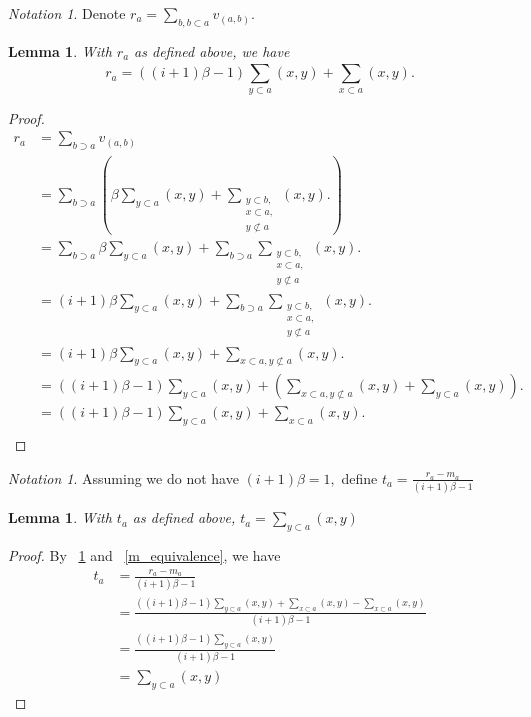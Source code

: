\documentclass[10 pt]{amsart}
\theoremstyle{plain}
\newtheorem{lem}[thm]{Lemma}
\theoremstyle{definition}
\theoremstyle{remark}
\newtheorem{note}[thm]{Notation}
\numberwithin{equation}{section}
\begin{document}
\begin{note}
Denote $r_a = \sum_{b,b\subset a}^{} v_{(a, b)}.$
\end{note}

\begin{lem}
\label{r_equivalence}
With $r_a$ as defined above, we have 
$$r_a = ((i+1)\beta-1)\sum_{y\subset a}^{}(x, y) +\sum_{x\subset a}^{}(x,y).$$
\end{lem}
\begin{proof}
\begin{align*}
  r_a &= \sum_{b\supset a}^{}v_{(a, b)}\\
  &=\sum_{b\supset a}^{} \left(\beta \sum_{y \subset a}^{}(x, y) + \sum_{\substack{{y\subset b,}\\{x \subset a,}\\{y\not\subset a}}}^{}(x, y).\right)\\
  &= \sum_{b\supset a}^{} \beta \sum_{y \subset a}^{}(x, y) + \sum_{b\supset a}^{} \sum_{\substack{{y\subset b,}\\{x \subset a,}\\{y\not\subset a}}}^{}(x, y).\\
  &= (i+1)\beta \sum_{y \subset a}^{}(x, y) + \sum_{b\supset a}^{} \sum_{\substack{{y\subset b,}\\{x \subset a,}\\{y\not\subset a}}}^{}(x, y).\\
  &= (i+1)\beta \sum_{y \subset a}^{}(x, y) + \sum_{x \subset a,y\not\subset a}^{}(x, y).\\
  &= ((i+1)\beta-1) \sum_{y \subset a}^{}(x, y) + \left( \sum_{x \subset a,y\not\subset a}^{}(x, y)+\sum_{y \subset a}^{}(x, y)\right).\\
  &= ((i+1)\beta-1) \sum_{y \subset a}^{}(x, y) + \sum_{x \subset a}^{}(x, y).\\
\end{align*}
\end{proof}
\begin{note}
Assuming we do not have $(i+1)\beta = 1,$ define $t_a = \frac{r_a - m_a}{(i+1)\beta - 1}$
\end{note}

\begin{lem}
\label{t_equivalence}
With $t_a$ as defined above, $t_a= \sum_{y\subset a}^{}(x, y) $
\end{lem}
\begin{proof}
By ~\ref{r_equivalence} and ~\ref{m_equivalence}, we have
\begin{align*}
  t_a &= \frac{r_a - m_a}{(i+1)\beta - 1}\\
  &= \frac{((i+1)\beta-1)\sum_{y\subset a}^{}(x, y) +\sum_{x\subset a}^{}(x, y)-\sum_{x\subset a}^{}(x, y) }{(i+1)\beta - 1}\\
  &= \frac{((i+1)\beta-1)\sum_{y\subset a}^{}(x, y)}{(i+1)\beta - 1}\\
  &= \sum_{y\subset a}^{}(x, y)
\end{align*}
\end{proof}
\end{document}

